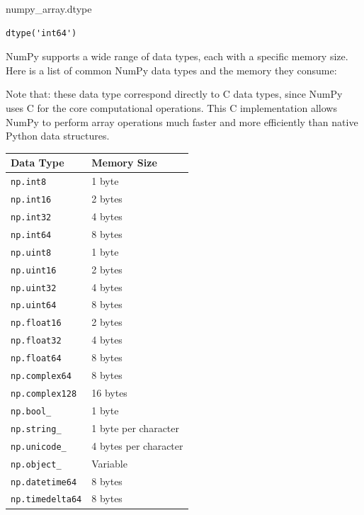 \documentclass[
  letterpaper,
  DIV=11,
  numbers=noendperiod]{scrreprt}
\newenvironment{Shaded}{\begin{snugshade}}{\end{snugshade}}
\newcommand{\NormalTok}[1]{\textcolor[rgb]{0.00,0.23,0.31}{#1}}
\begin{document}
\begin{Shaded}
\begin{Highlighting}[]
\NormalTok{numpy\_array.dtype}
\end{Highlighting}
\end{Shaded}

\begin{verbatim}
dtype('int64')
\end{verbatim}

NumPy supports a wide range of data types, each with a specific memory
size. Here is a list of common NumPy data types and the memory they
consume:

Note that: these data type correspond directly to C data types, since
NumPy uses C for the core computational operations. This C
implementation allows NumPy to perform array operations much faster and
more efficiently than native Python data structures.

\begin{longtable}[]{@{}ll@{}}
\toprule\noalign{}
Data Type & Memory Size \\
\midrule\noalign{}
\endhead
\bottomrule\noalign{}
\endlastfoot
\texttt{np.int8} & 1 byte \\
\texttt{np.int16} & 2 bytes \\
\texttt{np.int32} & 4 bytes \\
\texttt{np.int64} & 8 bytes \\
\texttt{np.uint8} & 1 byte \\
\texttt{np.uint16} & 2 bytes \\
\texttt{np.uint32} & 4 bytes \\
\texttt{np.uint64} & 8 bytes \\
\texttt{np.float16} & 2 bytes \\
\texttt{np.float32} & 4 bytes \\
\texttt{np.float64} & 8 bytes \\
\texttt{np.complex64} & 8 bytes \\
\texttt{np.complex128} & 16 bytes \\
\texttt{np.bool\_} & 1 byte \\
\texttt{np.string\_} & 1 byte per character \\
\texttt{np.unicode\_} & 4 bytes per character \\
\texttt{np.object\_} & Variable \\
\texttt{np.datetime64} & 8 bytes \\
\texttt{np.timedelta64} & 8 bytes \\
\end{longtable}
\end{document}
